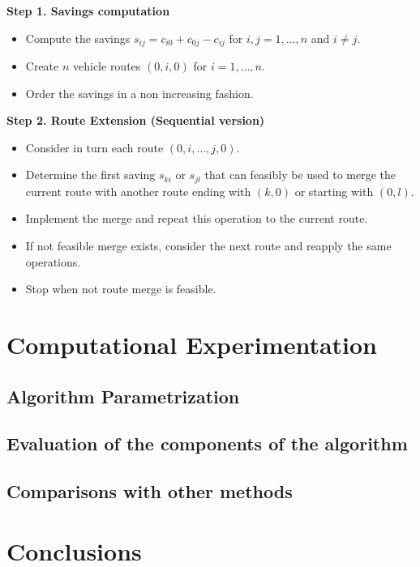 \documentclass[10pt,twoside]{article}
\begin{document}
\small{\textbf{Step 1. Savings computation}}
\begin{itemize}
\item Compute the savings $s_{ij}=c_{i0}+c_{0j}-c_{ij}$ for $i,j=1,…,n$ and $i \neq j$.
\item Create ${n}$ vehicle routes ${(0,i,0)}$ for ${i=1,…,n}$.
\item Order the savings in a non increasing fashion.\\
\end{itemize}
\small{\textbf{Step 2. Route Extension (Sequential version)}}
\begin{itemize}
\item Consider in turn each route ${(0,i,…,j,0)}$.
\item Determine the first saving ${s_{ki}}$ or ${s_{jl}}$ that can feasibly be used to merge the current route with another route ending with ${(k,0)}$ or starting with ${(0,l)}$.
\item Implement the merge and repeat this operation to the current route.
\item If not feasible merge exists, consider the next route and reapply the same operations.
\item Stop when not route merge is feasible.
\end{itemize}


\section{Computational Experimentation}\label{sec_results}
\subsection{Algorithm Parametrization}\label{sec_param}

\subsection{Evaluation of the components of the algorithm}\label{sec_eval}

\subsection{Comparisons with other methods}\label{sec_comp}

\section{Conclusions}\label{sec_conclusions}


{\small

{\nocite{*}}}
\end{document}
